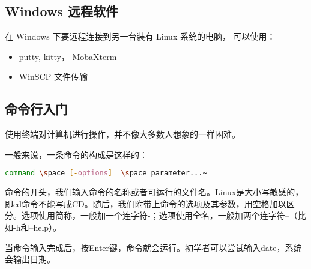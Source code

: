 \subsection{Windows 远程软件}
在 Windows 下要远程连接到另一台装有 Linux 系统的电脑， 可以使用：
\begin{itemize}
\item putty, kitty， MobaXterm
\item WinSCP 文件传输
\end{itemize}


\subsection{命令行入门}
使用终端对计算机进行操作，并不像大多数人想象的一样困难。

一般来说，一条命令的构成是这样的：
\begin{lstlisting}[language=bash]
command \space [-options]  \space parameter...~
\end{lstlisting}

命令的开头，我们输入命令的名称或者可运行的文件名。Linux是大小写敏感的，即cd命令不能写成CD。随后，我们附带上命令的选项及其参数，用空格加以区分。选项使用简称，一般加一个连字符-；选项使用全名，一般加两个连字符--（比如-h和--help）。

当命令输入完成后，按Enter键，命令就会运行。初学者可以尝试输入date，系统会输出日期。


